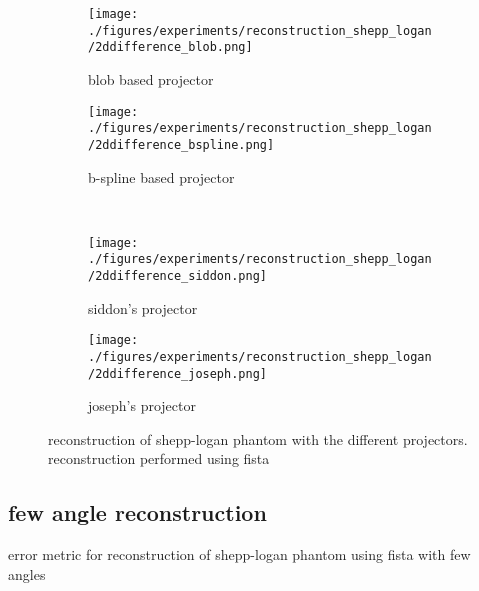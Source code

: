 \begin{figure}[h]
	\centering
	\begin{subfigure}[b]{0.45\textwidth}
		\centering
		\texttt{[image: ./figures/experiments/reconstruction\_shepp\_logan/2ddifference\_blob.png]}
		\caption{blob based projector}%
		\label{fig:reconstruction_shepp_logan_diff_blob}
	\end{subfigure}
	\begin{subfigure}[b]{0.45\textwidth}
		\centering
		\texttt{[image: ./figures/experiments/reconstruction\_shepp\_logan/2ddifference\_bspline.png]}
		\caption{b-spline based projector}%
		\label{fig:reconstruction_shepp_logan_diff_bspline}
	\end{subfigure} \\
	\begin{subfigure}[b]{0.45\textwidth}
		\centering
		\texttt{[image: ./figures/experiments/reconstruction\_shepp\_logan/2ddifference\_siddon.png]}
		\caption{siddon's projector}%
		\label{fig:reconstruction_shepp_logan_diff_siddon}
	\end{subfigure}
	\begin{subfigure}[b]{0.45\textwidth}
		\centering
		\texttt{[image: ./figures/experiments/reconstruction\_shepp\_logan/2ddifference\_joseph.png]}
		\caption{joseph's projector}%
		\label{fig:reconstruction_shepp_logan_diff_joseph}
	\end{subfigure}
	\caption{reconstruction of shepp-logan phantom with the different projectors. reconstruction
		performed using fista}%
	\label{fig:reconstruction_shepp_logan_diff}
\end{figure}


\subsection{few angle reconstruction}\label{sec:experiments_few_angle}

\begin{table}%
	\centering
	\caption{error metric for reconstruction of shepp-logan phantom using fista with few angles}%
	\label{tab:error_metric_shepp_logan}
\end{table}

